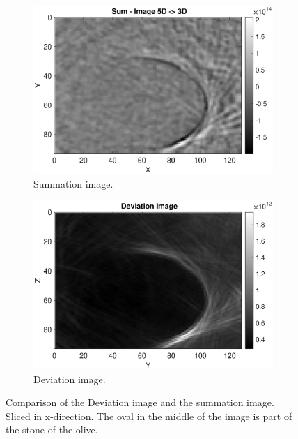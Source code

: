 \begin{figure}[H]
        \centering
    \begin{subfigure}[b]{0.61\textwidth}
         \centering
         \includegraphics[width=1.13\textwidth]{Graphics/Results/Variance_Image/Variance_Ortho_slice_63_x_direkt_compare_5d_to_3d.eps}
         \caption{Summation image. }
         \label{fig:deviation_image_x_slice_normal}
     \end{subfigure}
     \hfill
    \begin{subfigure}[b]{0.61\textwidth}
        \centering
        \includegraphics[width=1.13\textwidth]{Graphics/Results/Variance_Image/Variance_Ortho_slice_x_63.eps}
        \caption{Deviation image.}
        \label{fig:deviation_image_x_slice_deviation}
     \end{subfigure}
        \caption{Comparison of the Deviation image and the summation image. Sliced in x-direction. The oval in the middle of the image is part of the stone of the olive.}
        \label{fig:deviation_image_x_slice}
\end{figure}

